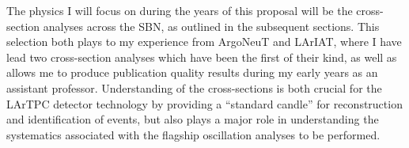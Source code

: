 The physics I will focus on during the years of this proposal will be the cross-section analyses across the SBN, as outlined in the subsequent sections. This selection both plays to my experience from ArgoNeuT and LArIAT, where I have lead two cross-section analyses which have been the first of their kind, as well as allows me to produce publication quality results during my early years as an assistant professor. Understanding of the cross-sections is both crucial for the LArTPC detector technology by providing a ``standard candle'' for reconstruction and identification of events, but also plays a major role in understanding the systematics associated with the flagship oscillation analyses to be performed.